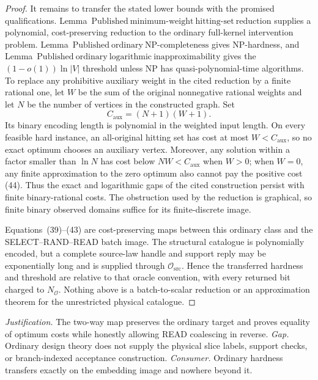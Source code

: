 \documentclass{article}
\begin{document}
\begin{proof}
It remains to transfer the stated lower bounds with the promised qualifications.  Lemma~\(\mathrm{Published\ minimum\mbox{-}weight\ hitting\mbox{-}set\ reduction}\) supplies a polynomial, cost-preserving reduction to the ordinary full-kernel intervention problem.  Lemma~\(\mathrm{Published\ ordinary\ NP\mbox{-}completeness}\) gives NP-hardness, and Lemma~\(\mathrm{Published\ ordinary\ logarithmic\ inapproximability}\) gives the \((1-o(1))\ln|V|\) threshold unless \(\mathrm{NP}\) has quasi-polynomial-time algorithms.  To replace any prohibitive auxiliary weight in the cited reduction by a finite rational one, let \(W\) be the sum of the original nonnegative rational weights and let \(N\) be the number of vertices in the constructed graph.  Set
\[
 C_{\mathrm{aux}}=(N+1)(W+1).
 \tag{44}
\]
Its binary encoding length is polynomial in the weighted input length.  On every feasible hard instance, an all-original hitting set has cost at most \(W<C_{\mathrm{aux}}\), so no exact optimum chooses an auxiliary vertex.  Moreover, any solution within a factor smaller than \(\ln N\) has cost below \(NW<C_{\mathrm{aux}}\) when \(W>0\); when \(W=0\), any finite approximation to the zero optimum also cannot pay the positive cost (44).  Thus the exact and logarithmic gaps of the cited construction persist with finite binary-rational costs.  The obstruction used by the reduction is graphical, so finite binary observed domains suffice for its finite-discrete image.

Equations~(39)--(43) are cost-preserving maps between this ordinary class and the SELECT--RAND--READ batch image.  The structural catalogue is polynomially encoded, but a complete source-law handle and support reply may be exponentially long and is supplied through \(\mathcal O_{\mathrm{src}}\).  Hence the transferred hardness and threshold are relative to that oracle convention, with every returned bit charged to \(N_{\mathcal O}\).  Nothing above is a batch-to-scalar reduction or an approximation theorem for the unrestricted physical catalogue.
\end{proof}
\par\smallskip\noindent \textit{Justification.} The two-way map preserves the ordinary target and proves equality of optimum costs while honestly allowing READ coalescing in reverse. \textit{Gap.} Ordinary design theory does not supply the physical slice labels, support checks, or branch-indexed acceptance construction. \textit{Consumer.} Ordinary hardness transfers exactly on the embedding image and nowhere beyond it.
\end{document}
